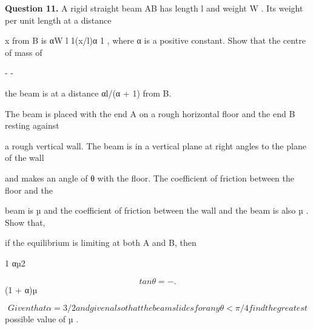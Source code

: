 \documentclass[12pt]{article}
\begin{document}
\begin{flushleft}
\bigskip\textbf{Question 11.} A rigid straight beam AB has length l and weight W . Its weight per unit length at a distance\par
x from B is αW l 1(x/l)α 1 , where α is a positive constant. Show that the centre of mass of\par
- -\par
the beam is at a distance αl/(α + 1) from B.\par
The beam is placed with the end A on a rough horizontal floor and the end B resting against\par
a rough vertical wall. The beam is in a vertical plane at right angles to the plane of the wall\par
and makes an angle of θ with the floor. The coefficient of friction between the floor and the\par
beam is µ and the coefficient of friction between the wall and the beam is also µ . Show that,\par
if the equilibrium is limiting at both A and B, then\par
1 αµ2\par
\[tan θ = - .\]
(1 + α)µ\par
\[Given that α = 3/2 and given also that the beam slides for any θ < \pi/4 find the greatest\]
possible value of µ .\par
\end{flushleft}
\end{document}
